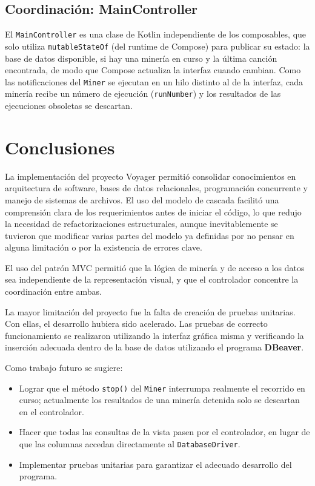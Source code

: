 \documentclass[12pt,a4paper]{article}
\begin{document}
\subsection{Coordinación: MainController}
El \texttt{MainController} es una clase de Kotlin independiente de los composables, que solo utiliza \texttt{mutableStateOf} (del runtime de Compose) para publicar su estado: la base de datos disponible, si hay una minería en curso y la última canción encontrada, de modo que Compose actualiza la interfaz cuando cambian. Como las notificaciones del \texttt{Miner} se ejecutan en un hilo distinto al de la interfaz, cada minería recibe un número de ejecución (\texttt{runNumber}) y los resultados de las ejecuciones obsoletas se descartan.
 
\section{Conclusiones}
La implementación del proyecto Voyager permitió consolidar conocimientos en arquitectura de software, bases de datos relacionales, programación concurrente y manejo de sistemas de archivos. El uso del modelo de cascada facilitó una comprensión clara de los requerimientos antes de iniciar el código, lo que redujo la necesidad de refactorizaciones estructurales, aunque inevitablemente se tuvieron que modificar varias partes del modelo ya definidas por no pensar en alguna limitación o por la existencia de errores clave.
 
El uso del patrón MVC permitió que la lógica de minería y de acceso a los datos sea independiente de la representación visual, y que el controlador concentre la coordinación entre ambas.

La mayor limitación del proyecto fue la falta de creación de pruebas unitarias. Con ellas, el desarrollo hubiera sido acelerado. Las pruebas de correcto funcionamiento se realizaron utilizando la interfaz gráfica misma y verificando la inserción adecuada dentro de la base de datos utilizando el programa \textbf{DBeaver}.
 
Como trabajo futuro se sugiere:
\begin{itemize}
  \item Lograr que el método \texttt{stop()} del \texttt{Miner} interrumpa realmente el recorrido en curso; actualmente los resultados de una minería detenida solo se descartan en el controlador.
  \item Hacer que todas las consultas de la vista pasen por el controlador, en lugar de que las columnas accedan directamente al \texttt{DatabaseDriver}.
  \item Implementar pruebas unitarias para garantizar el adecuado desarrollo del programa.
\end{itemize}
\end{document}
